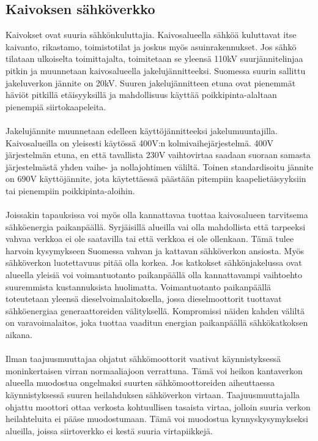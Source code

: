 \documentclass[finnish,12pt,a4paper,pdftex,elec,utf8]{aaltothesis}
\begin{document}
\subsection{Kaivoksen sähköverkko}
Kaivokset ovat suuria sähkönkuluttajia. Kaivosalueella sähköä kuluttavat itse kaivanto, rikastamo, toimistotilat ja joskus myös asuinrakennukset. Jos sähkö tilataan ulkoiselta toimittajalta, toimitetaan se yleensä 110kV suurjännitelinjaa pitkin ja muunnetaan kaivosalueella jakelujännitteeksi. Suomessa suurin sallittu jakeluverkon jännite on 20kV. Suuren jakelujännitteen etuna ovat pienemmät häviöt pitkillä etäisyyksillä ja mahdollisuus käyttää poikkipinta-alaltaan pienempiä siirtokaapeleita. \cite[s. 251-253]{Hakapää}
\\\\
Jakelujännite muunnetaan edelleen käyttöjännitteeksi jakelumuuntajilla. Kaivosalueilla on yleisesti käytössä 400V:n kolmivaihejärjestelmä. 400V järjestelmän etuna, en että tavallista 230V vaihtovirtaa saadaan suoraan samasta järjestelmästä yhden vaihe- ja nollajohtimen väliltä. Toinen standardisoitu jännite on 690V käyttöjännite, jota käytettäessä päästään pitempiin kaapelietäisyyksiin tai pienempiin poikkipinta-aloihin. \cite[s. 251-253]{Hakapää}
\\\\
Joissakin tapauksissa voi myös olla kannattavaa tuottaa kaivosalueen tarvitsema sähköenergia paikanpäällä. Syrjäisillä alueilla vai olla mahdollista että tarpeeksi vahvaa verkkoa ei ole saatavilla tai että verkkoa ei ole ollenkaan. Tämä tulee harvoin kysymykseen Suomessa vahvan ja kattavan sähköverkon ansiosta. Myös sähköverkon luotettavuus pitää olla korkea. Jos katkokset sähkönjakelussa ovat alueella yleisiä voi voimantuotanto paikanpäällä olla kannattavampi vaihtoehto suuremmista kustannuksista huolimatta. Voimantuotanto paikanpäällä toteutetaan yleensä dieselvoimalaitoksella, jossa dieselmoottorit tuottavat sähköenergiaa generaattoreiden välityksellä. Kompromissi näiden kahden väliltä on varavoimalaitos, joka tuottaa vaaditun energian paikanpäällä sähkökatkoksen aikana. \cite[s. 251-253]{Hakapää}
\\\\
Ilman taajuusmuuttajaa ohjatut sähkömoottorit vaativat käynnistyksessä moninkertaisen virran normaaliajoon verrattuna. Tämä voi heikon kantaverkon alueella muodostua ongelmaksi suurten sähkömoottoreiden aiheuttaessa käynnistyksessä suuren heilahduksen sähköverkon virtaan. Taajuusmuuttajalla ohjattu moottori ottaa verkosta kohtuullisen tasaista virtaa, jolloin suuria verkon heilahteluita ei pääse muodostumaan. Tämä voi muodostua kynnyskysymykseksi alueilla, joissa siirtoverkko ei kestä suuria virtapiikkejä. \cite{MyyntiHaastattelu}
\end{document}
